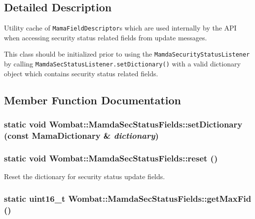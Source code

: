 \subsection{Detailed Description}
Utility cache of {\tt Mama\-Field\-Descriptor}s which are used internally by the API when accessing security status related fields from update messages. 

This class should be initialized prior to using the {\tt Mamda\-Security\-Status\-Listener} by calling {\tt Mamda\-Sec\-Status\-Listener.set\-Dictionary()} with a valid dictionary object which contains security status related fields. 



\subsection{Member Function Documentation}
\hypertarget{classWombat_1_1MamdaSecStatusFields_17d03af8bead7f50d20d3bef3752df39}{
\subsubsection[setDictionary]{\setlength{\rightskip}{0pt plus 5cm}static void Wombat::Mamda\-Sec\-Status\-Fields::set\-Dictionary (const Mama\-Dictionary \& {\em dictionary})}}
\label{classWombat_1_1MamdaSecStatusFields_17d03af8bead7f50d20d3bef3752df39}


\hypertarget{classWombat_1_1MamdaSecStatusFields_12b1044449ea4ba845122fdf708b5615}{
\subsubsection[reset]{\setlength{\rightskip}{0pt plus 5cm}static void Wombat::Mamda\-Sec\-Status\-Fields::reset ()}}
\label{classWombat_1_1MamdaSecStatusFields_12b1044449ea4ba845122fdf708b5615}


Reset the dictionary for security status update fields. 

\hypertarget{classWombat_1_1MamdaSecStatusFields_1c3eacda9d519ad0eb43ffd061e03a3b}{
\subsubsection[getMaxFid]{\setlength{\rightskip}{0pt plus 5cm}static uint16\_\-t Wombat::Mamda\-Sec\-Status\-Fields::get\-Max\-Fid ()}}
\label{classWombat_1_1MamdaSecStatusFields_1c3eacda9d519ad0eb43ffd061e03a3b}


